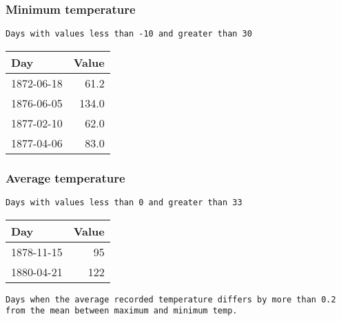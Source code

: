 \documentclass[]{article}
\begin{document}
\subsubsection{Minimum temperature}\label{minimum-temperature-1}

\begin{verbatim}
Days with values less than -10 and greater than 30
\end{verbatim}

\begin{longtable}[]{@{}lr@{}}
\toprule
Day & Value\tabularnewline
\midrule
\endhead
1872-06-18 & 61.2\tabularnewline
1876-06-05 & 134.0\tabularnewline
1877-02-10 & 62.0\tabularnewline
1877-04-06 & 83.0\tabularnewline
\bottomrule
\end{longtable}

\subsubsection{Average temperature}\label{average-temperature-1}

\begin{verbatim}
Days with values less than 0 and greater than 33
\end{verbatim}

\begin{longtable}[]{@{}lr@{}}
\toprule
Day & Value\tabularnewline
\midrule
\endhead
1878-11-15 & 95\tabularnewline
1880-04-21 & 122\tabularnewline
\bottomrule
\end{longtable}

\begin{verbatim}
Days when the average recorded temperature differs by more than 0.2 from the mean between maximum and minimum temp.
\end{verbatim}
\end{document}
